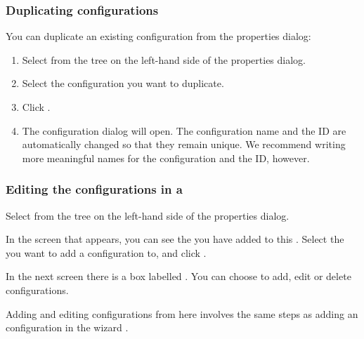 \subsubsection{Duplicating \gdaut{} configurations}

You can duplicate an existing \gdaut{} configuration from the \gdproject{} properties dialog:
\begin{enumerate}
\item Select  from the tree on the left-hand side of the \gdproject{} properties dialog.
\item Select the \gdaut{} configuration you want to duplicate.
\item Click .
\item The \gdaut{} configuration dialog will open. The \gdaut{} configuration name and the \gdaut{} ID are automatically changed so that they remain unique. We recommend writing more meaningful names for the configuration and the ID, however. 
\end{enumerate}


\subsubsection{Editing the \gdaut{} configurations in a \gdproject{}}
\label{ProjPropertiesEditAUTConfig}
Select  from the tree on the left-hand side of the \gdproject{} properties dialog. 

In the screen that appears, you can see the \gdauts{} you have added to this \gdproject{}. Select the \gdaut{} you want to add a configuration to, and click . 

In the next screen there is a box labelled . You can choose to add, edit or delete \gdaut{} configurations. 

Adding and editing \gdaut{} configurations from here involves the same steps as adding an \gdaut{} configuration in the \gdproject{} wizard . 


